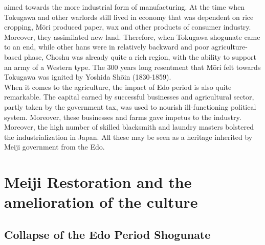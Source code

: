 \documentclass[11pt]{book}
\begin{document}
aimed towards the more industrial form of manufacturing. At the time when Tokugawa and other warlords still lived in economy that
was dependent on rice cropping, M\=ori produced paper, wax and other products of consumer industry. Moreover, they assimilated new land.
Therefore, when Tokugawa shogunate came to an end, while other hans were in relatively backward and poor agriculture-based phase, Choshu was
already quite a rich region, with the ability to support an army of a Western type. The 300 years long resentment that M\=ori felt towards
Tokugawa was ignited by Yoshida Sh\=oin (1830-1859).\\
When it comes to the agriculture, the impact of Edo period is also quite remarkable. The capital earned by successful businesses and
agricultural sector, partly taken by the government tax, was used to nourish ill-functioning political system. Moreover, these businesses and farms
gave impetus to the industry. Moreover, the high number of skilled blacksmith and laundry masters bolstered the industrialization in Japan. All 
these may be seen as a heritage inherited by Meiji government from the Edo.
\chapter{Meiji Restoration and the amelioration of the culture}
\section{Collapse of the Edo Period Shogunate}
\end{document}
